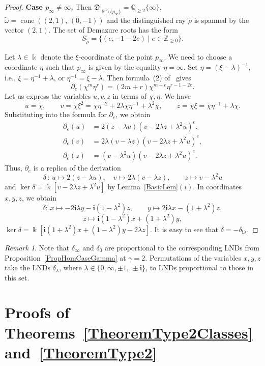 \documentclass[a4paper,reqno,12pt]{amsart}
\theoremstyle{plain}
\theoremstyle{definition}
\theoremstyle{plain}
\theoremstyle{remark}
\newtheorem{remark}[theorem]{Remark}
\newcommand{\ZZ}{\mathbb Z}
\newcommand{\QQ}{\mathbb Q}
\DeclareMathOperator{\cone}{cone}
\newcommand{\lmt}{\longmapsto}
\newcommand{\DD}{\mathfrak D}
\newcommand{\PP}{\mathbb P}
\newcommand{\ii}{\mathbf{i}}
\begin{document}
\begin{proof}
    {\bf Case $p_\infty\neq\infty$.} Then $\DD|_{\PP^1\setminus\{p_\infty\}}=\QQ_{\ge2}\{\infty\}$, $\tilde\omega=\cone((2,1),\,(0,-1))$ and the distinguished ray $\tilde\rho$ is spanned by the vector $(2,1)$. The set of Demazure roots has the form
    $$S_{\tilde\rho}=\{(e,-1-2e)\mid e\in\ZZ_{\ge0}\}.$$

    Let $\lambda\in\Bbbk$ denote the $\xi$-coordinate of the point $p_\infty$. We need to choose a coordinate $\eta$ such that $p_\infty$ is given by the equality $\eta=\infty$. Set $\eta=(\xi-\lambda)^{-1}$, i.e., $\xi=\eta^{-1}+\lambda$, or $\eta^{-1}=\xi-\lambda$. Then formula~(2) of~\cite{AL} gives $$\partial_e(\chi^m\eta^r)=(2m+r)\chi^{m+e}\eta^{r-1-2e}.$$
    Let us express the variables $u,v,z$ in terms of $\chi, \eta$. We have $$u=\chi, \qquad v=\chi\xi^2=\chi\eta^{-2}+2\lambda\chi\eta^{-1}+\lambda^2\chi,\qquad z=\chi\xi=\chi\eta^{-1}+\lambda\chi.$$ Substituting into the formula for $\partial_e$, we obtain
    \begin{equation*}
        \begin{split}
            \partial_e(u) &=
    2(z-\lambda u)(v-2\lambda z+\lambda^2 u)^e,\\ \partial_e(v) &= 2\lambda(v-\lambda z)(v-2\lambda z+\lambda^2 u)^e,\\
    \partial_e(z) &= (v-\lambda^2 u)(v-2\lambda z+\lambda^2 u)^e.
        \end{split}
    \end{equation*}
    Thus, $\partial_e$ is a replica of the derivation $$\delta\,\colon\,u\lmt 2(z-\lambda u),\quad v\lmt 2\lambda(v-\lambda z),\qquad z\lmt v-\lambda^2 u$$ and $\ker\delta=\Bbbk[v-2\lambda z+\lambda^2 u]$ by Lemma~\ref{BasicLem}$(i)$. In coordinates $x,y,z$, we obtain $$\delta\colon\,x\lmt -2\ii\lambda y-\ii(1-\lambda^2)z,\qquad y\lmt 2\ii\lambda x-(1+\lambda^2)z,$$
    $$z\lmt \ii(1-\lambda^2)x+(1+\lambda^2)y,$$
    $\ker\delta=\Bbbk[\ii(1+\lambda^2)x+(1-\lambda^2)y - 2\lambda z].$
    It is easy to see that $\delta=-\delta_{\ii\lambda}$.
\end{proof}
\begin{remark}
    Note that $\delta_\infty$ and $\delta_0$ are proportional to the corresponding LNDs from Proposition~\ref{PropHomCaseGamma} at $\gamma=2$. Permutations of the variables $x,y,z$ take the LNDs $\delta_\lambda$, where $\lambda\in\{0,\infty,\pm1,\,\pm\ii\}$, to LNDs proportional to those in this set.
\end{remark}

\section{Proofs of Theorems~\ref{TheoremType2Classes} and~\ref{TheoremType2}}\label{SectionProofs}
\end{document}
